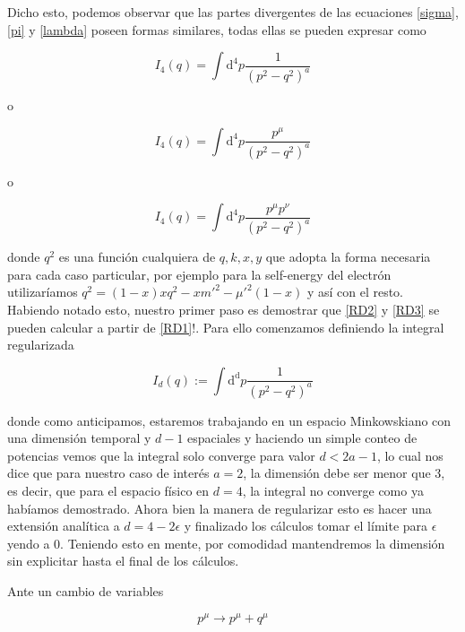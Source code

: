 \documentclass{article}
\numberwithin{equation}{section}
\begin{document}
Dicho esto, podemos observar que las partes divergentes de las ecuaciones \ref{sigma}, \ref{pi} y \ref{lambda} poseen formas similares, todas ellas se pueden expresar como

\begin{equation}\label{RD1}
I_4(q)=\int\mathrm{d^4}p \frac{1}{\left(p^2 - q^2 \right)^a}
\end{equation}

o

\begin{equation}\label{RD2}
I_4(q)=\int\mathrm{d^4}p \frac{p^{\mu}}{\left(p^2 - q^2 \right)^a}
\end{equation}

o

\begin{equation}\label{RD3}
I_4(q)=\int\mathrm{d^4}p \frac{p^{\mu} p^{\nu}}{\left(p^2 - q^2 \right)^a}
\end{equation}

donde $ q^2 $ es una función cualquiera de $ q,k,x,y $ que adopta la forma necesaria para cada caso particular, por ejemplo para la self-energy del electrón utilizaríamos $ q^2 = (1-x)xq^{2}-xm'^{2}-\mu'^{2}(1-x) $ y así con el resto.  
Habiendo notado esto, nuestro primer paso es demostrar que \ref{RD2} y \ref{RD3} se pueden calcular a partir de \ref{RD1}!.
Para ello comenzamos definiendo la integral regularizada

\begin{equation}\label{RD4}
I_d(q):=\int\mathrm{d^d}p \frac{1}{\left(p^2 - q^2 \right)^a}
\end{equation}

donde como anticipamos, estaremos trabajando en un espacio Minkowskiano con una dimensión temporal y $ d-1 $ espaciales y haciendo un simple conteo de potencias vemos que la integral solo converge para valor $ d< 2a -1 $, lo cual nos dice que para nuestro caso de interés $ a=2 $, la dimensión debe ser menor que 3, es decir, que para el espacio físico en $ d=4 $, la integral no converge como ya habíamos demostrado. Ahora bien la manera de regularizar esto es hacer una extensión analítica a $ d= 4 -2\epsilon $ y finalizado los cálculos tomar el límite para $ \epsilon $ yendo a $ 0 $. Teniendo esto en mente, por comodidad mantendremos la dimensión sin explicitar hasta el final de los cálculos.

Ante un cambio de variables

\begin{equation}\label{RDtransf}
p^{\mu} \longrightarrow p^{\mu} + q^{\mu} 
\end{equation}
\end{document}

